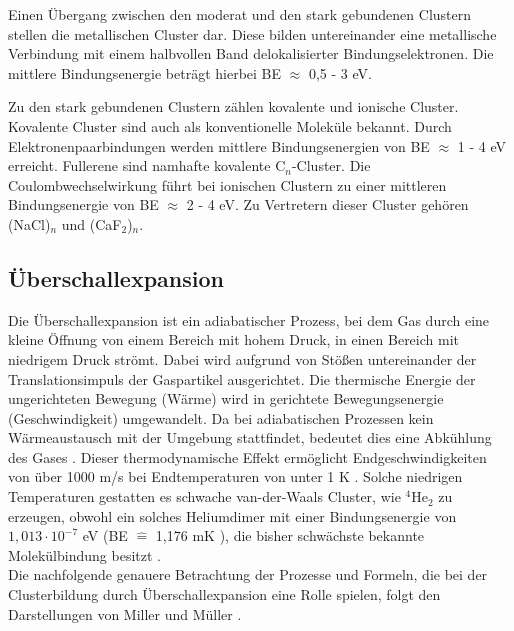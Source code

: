  Einen Übergang zwischen den moderat und den stark gebundenen Clustern stellen die metallischen Cluster dar. Diese bilden untereinander eine metallische Verbindung mit einem halbvollen Band delokalisierter Bindungselektronen. Die mittlere Bindungsenergie beträgt hierbei BE $\approx$ 0,5 - 3 eV. \cite{jortner1984cluster}
 
 Zu den stark gebundenen Clustern zählen kovalente und ionische Cluster.
 Kovalente Cluster sind auch als konventionelle Moleküle bekannt. Durch Elektronenpaarbindungen  werden mittlere Bindungsenergien von BE $\approx$ 1 - 4 eV erreicht. Fullerene sind namhafte kovalente C$_n$-Cluster.  \cite{jortner1984cluster}
 Die Coulombwechselwirkung führt bei ionischen Clustern zu einer mittleren Bindungsenergie von BE $\approx$ 2 - 4 eV. Zu Vertretern dieser Cluster gehören (NaCl)$_n$ und (CaF$_2$)$_n$. \cite{jortner1984cluster} \\

\subsection{Überschallexpansion} \label{sec:uberschallexp}

Die Überschallexpansion ist ein adiabatischer Prozess, bei dem Gas durch eine kleine Öffnung von einem Bereich mit hohem Druck, in einen Bereich mit niedrigem Druck strömt. Dabei wird aufgrund von Stößen untereinander der Translationsimpuls der Gaspartikel ausgerichtet. Die thermische Energie der ungerichteten Bewegung (Wärme) wird in gerichtete Bewegungsenergie (Geschwindigkeit) umgewandelt. Da bei adiabatischen Prozessen kein Wärmeaustausch mit der Umgebung stattfindet, bedeutet dies eine Abkühlung des Gases \cite{Vielteilch92}. Dieser thermodynamische Effekt ermöglicht Endgeschwindigkeiten von über 1000 m/s bei Endtemperaturen von unter 1 K \cite{mueller12}. 
Solche niedrigen Temperaturen gestatten es schwache van-der-Waals Cluster, wie  $\mathrm{^4}\mathrm{He}_2$ zu erzeugen, obwohl ein solches Heliumdimer mit einer Bindungsenergie von \\ $\mathrm{1,013\cdot10^{-7}}$ eV (BE $\widehat{=}$ 1,176 mK \cite{Lohr2007}), die bisher schwächste bekannte Molekülbindung besitzt \cite{Luo1993}. \\
Die nachfolgende genauere Betrachtung der Prozesse und Formeln, die bei der Clusterbildung durch Überschallexpansion eine Rolle spielen, folgt den Darstellungen von Miller \cite{scoles1988} und Müller \cite{mul13}.


